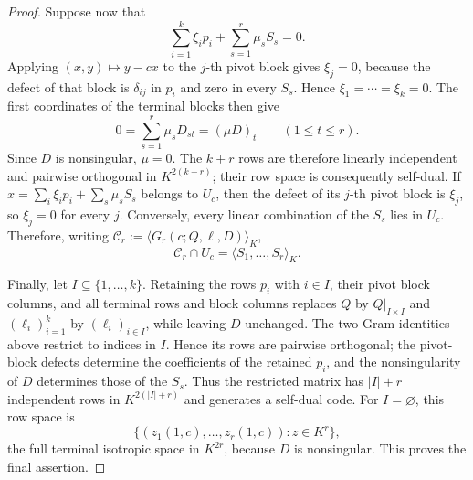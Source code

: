 \documentclass[10pt,a4paper]{amsart}
\begin{document}
\begin{proof}
Suppose now that
\[
 \sum_{i=1}^k\xi_i p_i+\sum_{s=1}^r\mu_sS_s=0.
\]
Applying \((x,y)\mapsto y-cx\) to the \(j\)-th pivot block gives
\(\xi_j=0\), because the defect of that block is \(\delta_{ij}\) in
\(p_i\) and zero in every \(S_s\).  Hence \(\xi_1=\cdots=\xi_k=0\).
The first coordinates of the terminal blocks then give
\[
 0=\sum_{s=1}^r\mu_sD_{st}=(\mu D)_t
 \qquad(1\le t\le r).
\]
Since \(D\) is nonsingular, \(\mu=0\).  The \(k+r\) rows are therefore
linearly independent and pairwise orthogonal in \(K^{2(k+r)}\); their row
space is consequently self-dual.  If
\(x=\sum_i\xi_ip_i+\sum_s\mu_sS_s\) belongs to \(U_c\), then the defect of
its \(j\)-th pivot block is \(\xi_j\), so \(\xi_j=0\) for every \(j\).
Conversely, every linear combination of the \(S_s\) lies in \(U_c\).
Therefore, writing
\(\mathcal C_r:=\langle G_r(c;Q,\ell,D)\rangle_K\),
\[
 \mathcal C_r\cap U_c
   =\langle S_1,\ldots,S_r\rangle_K.
\]

Finally, let \(I\subseteq\{1,\ldots,k\}\).  Retaining the rows \(p_i\)
with \(i\in I\), their pivot block columns, and all terminal rows and block
columns replaces \(Q\) by \(Q|_{I\times I}\) and \((\ell_i)_{i=1}^k\) by
\((\ell_i)_{i\in I}\), while leaving \(D\) unchanged.  The two Gram
identities above restrict to indices in \(I\).  Hence its rows are pairwise
orthogonal; the pivot-block defects determine the coefficients of the
retained \(p_i\), and the nonsingularity of \(D\) determines those of the
\(S_s\).  Thus the restricted matrix has \(|I|+r\) independent rows in
\(K^{2(|I|+r)}\) and generates a self-dual code.  For
\(I=\varnothing\), this row space is
\[
 \{(z_1(1,c),\ldots,z_r(1,c)):z\in K^r\},
\]
the full terminal isotropic space in \(K^{2r}\), because \(D\) is
nonsingular.  This proves the final assertion.
\end{proof}
\end{document}
